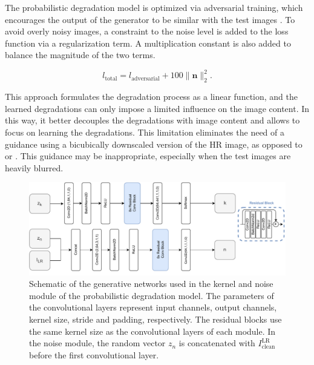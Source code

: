     The probabilistic degradation model is optimized via adversarial training, which encourages the output of the generator to be similar with the test images \cite{bulat2018learn}.
    To avoid overly noisy images, a constraint to the noise level is added to the loss function via a regularization term. 
    A multiplication constant is also added to balance the magnitude of the two terms.

    \begin{equation}
        l_{\text{total}} = l_{\text{adversarial}} + 100 \|\mathbf{n}\|_2^2.
    \end{equation}

    This approach formulates the degradation process as a linear function, and the learned degradations can only impose a limited influence on the image content.
    In this way, it better decouples the degradations with image content and allows to focus on learning the degradations.
    This limitation eliminates the need of a guidance using a bicubically downscaled version of the HR image, as opposed to \cite{wei2020unsupervised} or \cite{bulat2018learn}.
    This guidance may be inappropriate, especially when the test images are heavily blurred.

    \begin{figure}[H]
        \centering
        \includegraphics[width=\textwidth]{Includes/3-slim-gen-module.pdf}
        \caption{Schematic of the generative networks used in the kernel and noise module of the probabilistic degradation model.
        The parameters of the convolutional layers represent input channels, output channels, kernel size, stride and padding, respectively.
        The residual blocks use the same kernel size as the convolutional layers of each module. 
        In the noise module, the random vector $z_n$ is concatenated with $I_{\text{clean}}^{\text{LR}}$ before the first convolutional layer. }
        \label{fig:3-slim-gen-module}
    \end{figure}

